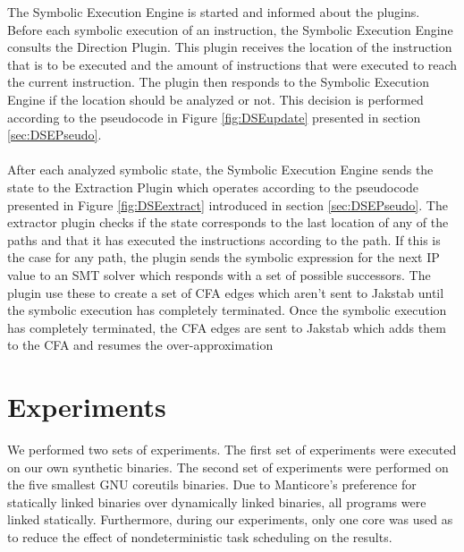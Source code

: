\documentclass{kththesis}
\newcommand{\fbcomment}[1]{{#1}}
\renewcommand{\fbcomment}[1]{}
\begin{document}
\clearpage
\noindent
The Symbolic Execution Engine is started and informed about the plugins. Before each symbolic execution of an instruction, the Symbolic Execution Engine consults the Direction Plugin. This plugin receives the location of the instruction that is to be executed and the amount of instructions that were executed to reach the current instruction. The plugin then responds to the Symbolic Execution Engine if the location should be analyzed or not. This decision is performed according to the pseudocode in Figure \ref{fig:DSEupdate} presented in section \ref{sec:DSEPseudo}. 
\\ \\
After each analyzed symbolic state, the Symbolic Execution Engine sends the state to the Extraction Plugin which operates according to the pseudocode presented in Figure \ref{fig:DSEextract} introduced in section \ref{sec:DSEPseudo}. The extractor plugin checks if the state corresponds to the last location of any of the paths and that it has executed the instructions according to the path. If this is the case for any path, the plugin sends the symbolic expression for the next IP value to an SMT solver which responds with a set of possible successors. The plugin use these to create a set of CFA edges which aren't sent to Jakstab until the symbolic execution has completely terminated. Once the symbolic execution has completely terminated, the CFA edges are sent to Jakstab which adds them to the CFA and resumes the over-approximation
\section{Experiments}
\fbcomment{\color{red}Goal: Describe what experiments were done and why. Also, describe with enough details for the experiments to be reproducible}
We performed two sets of experiments. The first set of experiments were executed on our own synthetic binaries. The second set of experiments were performed on the five smallest GNU coreutils binaries. Due to Manticore's preference for statically linked binaries over dynamically linked binaries, all programs were linked statically. Furthermore, during our experiments, only one core was used as to reduce the effect of nondeterministic task scheduling on the results. 
\end{document}
